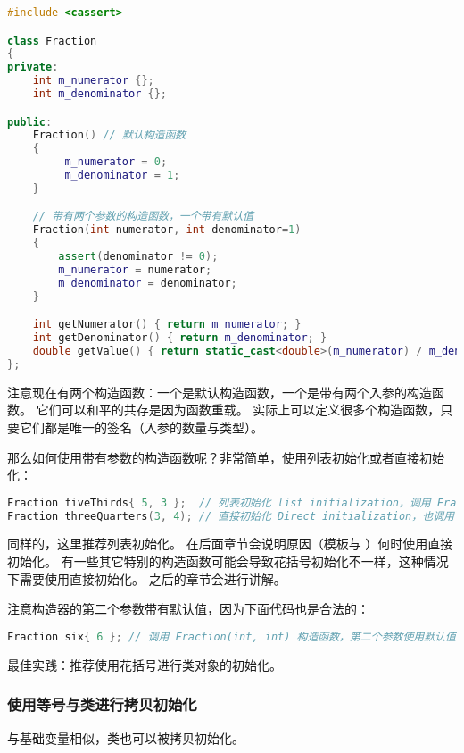 \documentclass[../../LearnCpp.tex]{subfiles}
\begin{document}
\begin{lstlisting}[language=C++]
#include <cassert>

class Fraction
{
private:
    int m_numerator {};
    int m_denominator {};

public:
    Fraction() // 默认构造函数
    {
         m_numerator = 0;
         m_denominator = 1;
    }

    // 带有两个参数的构造函数，一个带有默认值
    Fraction(int numerator, int denominator=1)
    {
        assert(denominator != 0);
        m_numerator = numerator;
        m_denominator = denominator;
    }

    int getNumerator() { return m_numerator; }
    int getDenominator() { return m_denominator; }
    double getValue() { return static_cast<double>(m_numerator) / m_denominator; }
};
\end{lstlisting}

注意现在有两个构造函数：一个是默认构造函数，一个是带有两个入参的构造函数。
它们可以和平的共存是因为函数重载。
实际上可以定义很多个构造函数，只要它们都是唯一的签名（入参的数量与类型）。

那么如何使用带有参数的构造函数呢？非常简单，使用列表初始化或者直接初始化：

\begin{lstlisting}[language=C++]
Fraction fiveThirds{ 5, 3 };  // 列表初始化 list initialization，调用 Fraction(int, int)
Fraction threeQuarters(3, 4); // 直接初始化 Direct initialization，也调用 Fraction(int, int)
\end{lstlisting}

同样的，这里推荐列表初始化。
在后面章节会说明原因（模板与 ）何时使用直接初始化。
有一些其它特别的构造函数可能会导致花括号初始化不一样，这种情况下需要使用直接初始化。
之后的章节会进行讲解。

注意构造器的第二个参数带有默认值，因为下面代码也是合法的：

\begin{lstlisting}[language=C++]
Fraction six{ 6 }; // 调用 Fraction(int, int) 构造函数，第二个参数使用默认值 1
\end{lstlisting}

最佳实践：推荐使用花括号进行类对象的初始化。

\subsubsection*{使用等号与类进行拷贝初始化}

与基础变量相似，类也可以被拷贝初始化。
\end{document}
